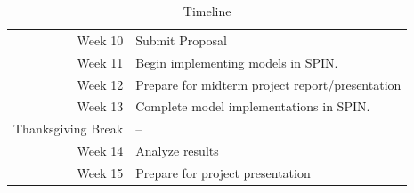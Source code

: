 \documentclass[12pt]{article}
\begin{document}
\begin{table}[b]
\centering
\captionsetup{labelfont=sc, labelsep=quad}
\caption{Timeline}
\begin{tabular}{@{\,}r <{\hskip 2pt} !{\makebox[0pt]{\textbullet}\hskip-0.5pt\vrule width 1pt\hspace{\labelsep}} >{\raggedright\arraybackslash}p{5cm}}
\toprule
\addlinespace[1.5ex]
Week 10 & Submit Proposal\\
Week 11 & Begin implementing models in SPIN.\\
Week 12 & Prepare for midterm project report/presentation\\
Week 13 & Complete model implementations in SPIN.\\
Thanksgiving Break & --\\
Week 14 & Analyze results\\
Week 15 & Prepare for project presentation\\
\end{tabular}
    \label{tab:timeline}
\end{table}



\clearpage{
\printbibliography
}
\end{document}
